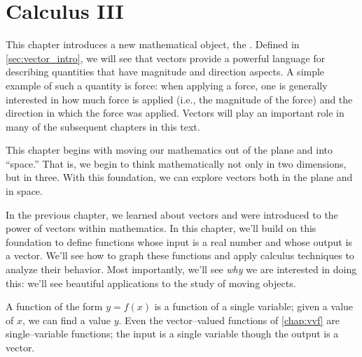 \part{Calculus III}



This chapter introduces a new mathematical object, the . Defined in \autoref{sec:vector_intro}, we will see that vectors provide a powerful language for describing quantities that have magnitude and direction aspects. A simple example of such a quantity is force: when applying a force, one is generally interested in how much force is applied (i.e., the magnitude of the force) and the direction in which the force was applied. Vectors will play an important role in many of the subsequent chapters in this text. 

This chapter begins with moving our mathematics out of the plane and into ``space.'' That is, we begin to think mathematically not only in two dimensions, but in three. With this foundation, we can explore vectors both in the plane and in space. 











In the previous chapter, we learned about vectors and were introduced to the power of vectors within mathematics. In this chapter, we'll build on this foundation to define functions whose input is a real number and whose output is a vector. We'll see how to graph these functions and apply calculus techniques to analyze their behavior. Most importantly, we'll see \textit{why} we are interested in doing this: we'll see beautiful applications to the study of moving objects.









A function of the form $y=f(x)$ is a function of a single variable; given a value of $x$, we can find a value $y$. Even the vector--valued functions of \autoref{chap:vvf} are single--variable functions; the input is a single variable though the output is a vector.


